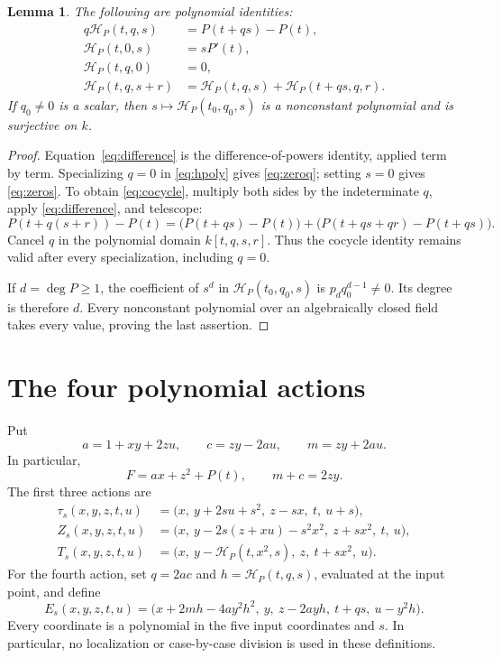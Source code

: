 \documentclass[11pt,letterpaper]{article}
\newcommand{\dd}{\mathcal H}
\newtheorem{lemma}[theorem]{Lemma}
\theoremstyle{remark}
\begin{document}
\begin{lemma}\label{lem:divided}
The following are polynomial identities:
\begin{align}
q\dd_P(t,q,s)&=P(t+qs)-P(t),\label{eq:difference}\\
\dd_P(t,0,s)&=sP'(t),\label{eq:zeroq}\\
\dd_P(t,q,0)&=0,\label{eq:zeros}\\
\dd_P(t,q,s+r)&=\dd_P(t,q,s)+\dd_P(t+qs,q,r).\label{eq:cocycle}
\end{align}
If $q_0\ne0$ is a scalar, then $s\mapsto\dd_P(t_0,q_0,s)$ is a nonconstant polynomial and is surjective on $k$.
\end{lemma}

\begin{proof}
Equation~\eqref{eq:difference} is the difference-of-powers identity, applied term by term. Specializing $q=0$ in \eqref{eq:hpoly} gives \eqref{eq:zeroq}; setting $s=0$ gives \eqref{eq:zeros}. To obtain \eqref{eq:cocycle}, multiply both sides by the indeterminate $q$, apply \eqref{eq:difference}, and telescope:
\[
P(t+q(s+r))-P(t)
=\bigl(P(t+qs)-P(t)\bigr)
 +\bigl(P(t+qs+qr)-P(t+qs)\bigr).
\]
Cancel $q$ in the polynomial domain $k[t,q,s,r]$. Thus the cocycle identity remains valid after every specialization, including $q=0$.

If $d=\deg P\ge1$, the coefficient of $s^d$ in $\dd_P(t_0,q_0,s)$ is $p_dq_0^{d-1}\ne0$. Its degree is therefore $d$. Every nonconstant polynomial over an algebraically closed field takes every value, proving the last assertion.
\end{proof}

\section{The four polynomial actions}\label{sec:actions}

Put
\begin{equation}\label{eq:acm}
a=1+xy+2zu,\qquad c=zy-2au,\qquad m=zy+2au.
\end{equation}
In particular,
\begin{equation}\label{eq:relations}
F=ax+z^2+P(t),\qquad m+c=2zy.
\end{equation}
The first three actions are
\begin{align}
\tau_s(x,y,z,t,u)
 &=\bigl(x,\ y+2su+s^2,\ z-sx,\ t,\ u+s\bigr),\label{eq:tau}\\
Z_s(x,y,z,t,u)
 &=\bigl(x,\ y-2s(z+xu)-s^2x^2,\ z+sx^2,\ t,\ u\bigr),\label{eq:z}\\
T_s(x,y,z,t,u)
 &=\bigl(x,\ y-\dd_P(t,x^2,s),\ z,\ t+sx^2,\ u\bigr).\label{eq:t}
\end{align}
For the fourth action, set $q=2ac$ and $h=\dd_P(t,q,s)$, evaluated at the input point, and define
\begin{equation}\label{eq:e}
E_s(x,y,z,t,u)
=\bigl(x+2mh-4ay^2h^2,\ y,\ z-2ayh,\ t+qs,\ u-y^2h\bigr).
\end{equation}
Every coordinate is a polynomial in the five input coordinates and $s$. In particular, no localization or case-by-case division is used in these definitions.
\end{document}
